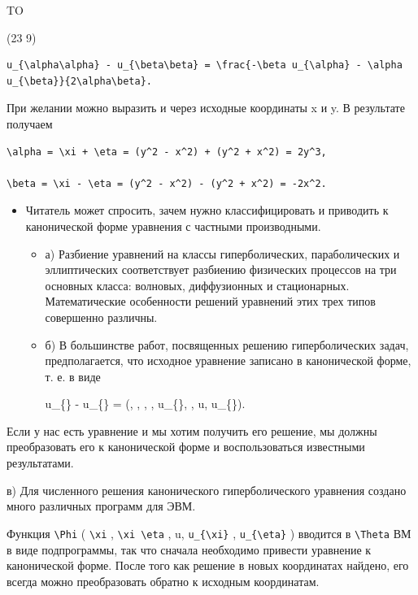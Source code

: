 \documentclass[
  ukrainian,
]{article}
\providecommand{\tightlist}{%
  \setlength{\itemsep}{0pt}\setlength{\parskip}{0pt}}
\begin{document}
TO

(23 9)

\begin{verbatim}
u_{\alpha\alpha} - u_{\beta\beta} = \frac{-\beta u_{\alpha} - \alpha u_{\beta}}{2\alpha\beta}.
\end{verbatim}

При желании можно выразить \alpha   и \beta   через исходные координаты
x и y. В результате получаем

\begin{verbatim}
\alpha = \xi + \eta = (y^2 - x^2) + (y^2 + x^2) = 2y^3,

\beta = \xi - \eta = (y^2 - x^2) - (y^2 + x^2) = -2x^2.
\end{verbatim}

\begin{itemize}
\tightlist
\item
  Читатель может спросить, зачем нужно классифицировать и приводить к
  канонической форме уравнения с частными производными.

  \begin{itemize}
  \item
    а) Разбиение уравнений на классы гиперболических, параболических и
    эллиптических соответствует разбиению физических процессов на три
    основных класса: волновых, диффузионных и стационарных.
    Математические особенности решений уравнений этих трех типов
    совершенно различны.
  \item
    б) В большинстве работ, посвященных решению гиперболических задач,
    предполагается, что исходное уравнение записано в канонической
    форме, т. е. в виде

    u\_\{\xi\xi\} - u\_\{\eta\eta\} = \Psi(\xi, , \eta, , u\_\{\xi\}, ,
    u, u\_\{\eta\}).
  \end{itemize}
\end{itemize}

Если у нас есть уравнение и мы хотим получить его решение, мы должны
преобразовать его к канонической форме и воспользоваться известными
результатами.

в) Для численного решения канонического гиперболического уравнения
создано много различных программ для ЭВМ.

Функция \texttt{\textbackslash{}Phi} ( \texttt{\textbackslash{}xi} ,
\texttt{\textbackslash{}xi\ \textbackslash{}eta} , u,
\texttt{u\_\{\textbackslash{}xi\}} , \texttt{u\_\{\textbackslash{}eta\}}
) вводится в \texttt{\textbackslash{}Theta} ВМ в виде подпрограммы, так
что сначала необходимо привести уравнение к канонической форме. После
того как решение в новых координатах найдено, его всегда можно
преобразовать обратно к исходным координатам.
\end{document}
